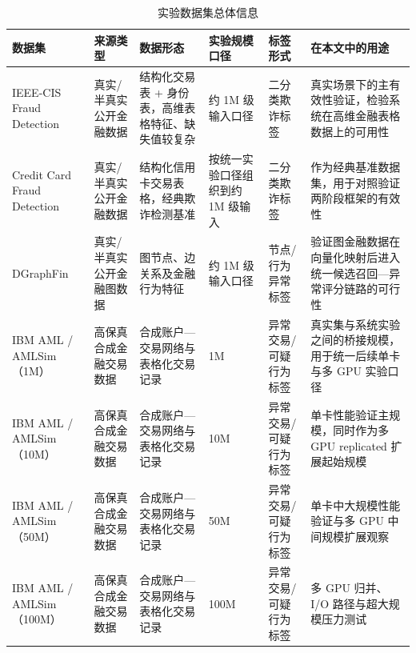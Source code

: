 \begin{table}[htbp]
  \caption{实验数据集总体信息}
  \label{tab:datasets-overall}
  \centering
  \small
  \renewcommand{\arraystretch}{1.2}
  \begin{adjustbox}{max width=\linewidth}
  \begin{tabular}{P{2.8cm}P{2.6cm}P{4.0cm}P{2.3cm}P{2.6cm}P{4.1cm}}
    \toprule
    数据集 & 来源类型 & 数据形态 & 实验规模口径 & 标签形式 & 在本文中的用途\\
    \midrule
    IEEE-CIS Fraud Detection & 真实/半真实公开金融数据 & 结构化交易表 + 身份表，高维表格特征、缺失值较复杂 & 约 1M 级输入口径 & 二分类欺诈标签 & 真实场景下的主有效性验证，检验系统在高维金融表格数据上的可用性\\
    Credit Card Fraud Detection & 真实/半真实公开金融数据 & 结构化信用卡交易表格，经典欺诈检测基准 & 按统一实验口径组织到约 1M 级输入 & 二分类欺诈标签 & 作为经典基准数据集，用于对照验证两阶段框架的有效性\\
    DGraphFin & 真实/半真实公开金融图数据 & 图节点、边关系及金融行为特征 & 约 1M 级输入口径 & 节点/行为异常标签 & 验证图金融数据在向量化映射后进入统一候选召回---异常评分链路的可行性\\
    IBM AML / AMLSim（1M） & 高保真合成金融交易数据 & 合成账户---交易网络与表格化交易记录 & 1M & 异常交易/可疑行为标签 & 真实集与系统实验之间的桥接规模，用于统一后续单卡与多 GPU 实验口径\\
    IBM AML / AMLSim（10M） & 高保真合成金融交易数据 & 合成账户---交易网络与表格化交易记录 & 10M & 异常交易/可疑行为标签 & 单卡性能验证主规模，同时作为多 GPU replicated 扩展起始规模\\
    IBM AML / AMLSim（50M） & 高保真合成金融交易数据 & 合成账户---交易网络与表格化交易记录 & 50M & 异常交易/可疑行为标签 & 单卡中大规模性能验证与多 GPU 中间规模扩展观察\\
    IBM AML / AMLSim（100M） & 高保真合成金融交易数据 & 合成账户---交易网络与表格化交易记录 & 100M & 异常交易/可疑行为标签 & 多 GPU 归并、I/O 路径与超大规模压力测试\\
    \bottomrule
  \end{tabular}
  \end{adjustbox}
\end{table}

